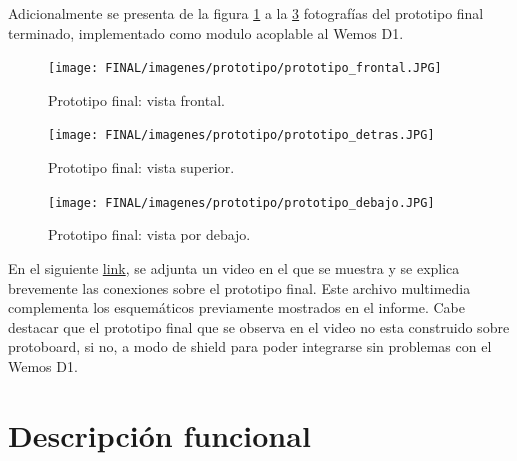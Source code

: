     Adicionalmente se presenta de la figura \ref{fig:hw-conexionado-final-real1} a la \ref{fig:hw-conexionado-final-real3} fotografías del prototipo final terminado, implementado como modulo acoplable al Wemos D1.
    
    \begin{figure}[ht!]
        \centering
        \begin{center}
            \texttt{[image: FINAL/imagenes/prototipo/prototipo\_frontal.JPG]}
            \caption{Prototipo final: vista frontal.}
            \label{fig:hw-conexionado-final-real1}
        \end{center}
    \end{figure}
    
     \begin{figure}[ht!]
        \centering
        \begin{center}
            \texttt{[image: FINAL/imagenes/prototipo/prototipo\_detras.JPG]}
            \caption{Prototipo final: vista superior.}
            \label{fig:hw-conexionado-final-real2}
        \end{center}
    \end{figure}
    
   \begin{figure}[ht!]
        \centering
        \begin{center}
            \texttt{[image: FINAL/imagenes/prototipo/prototipo\_debajo.JPG]}
            \caption{Prototipo final: vista por debajo.}
            \label{fig:hw-conexionado-final-real3}
        \end{center}
    \end{figure}
    
    En el siguiente \href{https://youtu.be/TNQlC1HrduE}{link}, se adjunta un video en el que se muestra y se explica brevemente las conexiones sobre el prototipo final. Este archivo multimedia complementa los esquemáticos previamente mostrados en el informe. Cabe destacar que el prototipo final que se observa en el video no esta construido sobre protoboard, si no, a modo de shield para poder integrarse sin problemas con el Wemos D1.



\section{Descripción funcional}


